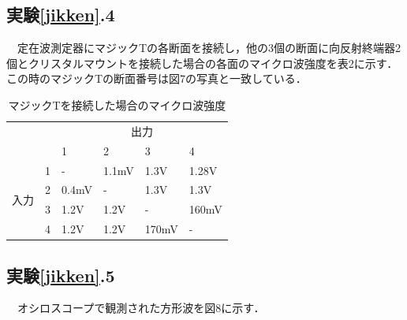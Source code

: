   \subsection{実験\ref{jikken}.4}
  　定在波測定器にマジックTの各断面を接続し，他の3個の断面に向反射終端器2個とクリスタルマウントを接続した場合の各面のマイクロ波強度を表2に示す．この時のマジックTの断面番号は図7の写真と一致している．

  \begin{table}[H]
    \centering
    \caption{マジックTを接続した場合のマイクロ波強度}
    \begin{tabular}{cl|l|l|l|l|}
    \cline{3-6}
    \multicolumn{1}{l}{}                      &   & \multicolumn{4}{c|}{出力}       \\ \cline{3-6}
    \multicolumn{1}{l}{}                      &   & 1     & 2     & 3     & 4     \\ \hline
    \multicolumn{1}{|c|}{\multirow{4}{*}{入力}} & 1 &    -   & 1.1mV & 1.3V  & 1.28V \\ \cline{2-6}
    \multicolumn{1}{|c|}{}                    & 2 & 0.4mV &   -    & 1.3V  & 1.3V  \\ \cline{2-6}
    \multicolumn{1}{|c|}{}                    & 3 & 1.2V  & 1.2V  &    -   & 160mV \\ \cline{2-6}
    \multicolumn{1}{|c|}{}                    & 4 & 1.2V  & 1.2V  & 170mV &   -    \\ \hline
    \end{tabular}
  \end{table}

  \subsection{実験\ref{jikken}.5}
  　オシロスコープで観測された方形波を図8に示す．

